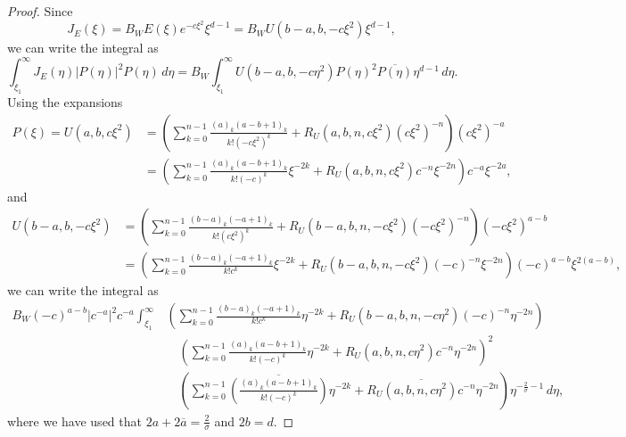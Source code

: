 \documentclass[11pt]{article}
\newcommand{\conj}[1]{\overline{#1}}
\begin{document}
\begin{proof}
  Since
  \begin{equation*}
    J_{E}(\xi) = B_{W}E(\xi)e^{-c\xi^{2}}\xi^{d - 1}
    = B_{W}U(b - a, b, -c\xi^{2})\xi^{d - 1},
  \end{equation*}
  we can write the integral as
  \begin{equation*}
    \int_{\xi_{1}}^{\infty} J_{E}(\eta)|P(\eta)|^{2}P(\eta)\,d\eta
    = B_{W}\int_{\xi_{1}}^{\infty} U(b - a, b, -c\eta^{2})P(\eta)^{2}\conj{P(\eta)}\eta^{d - 1}\,d\eta.
  \end{equation*}
  Using the expansions
  \begin{equation*}
    \begin{split}
      P(\xi)
      = U(a, b, c\xi^{2})
      &= \left(
        \sum_{k = 0}^{n - 1} \frac{(a)_{k}(a - b + 1)_{k}}{k!(-c\xi^{2})^{k}}
        + R_{U}(a, b, n, c\xi^{2})\left(c\xi^{2}\right)^{-n}
        \right)\left(c\xi^{2}\right)^{-a}\\
      &= \left(
        \sum_{k = 0}^{n - 1} \frac{(a)_{k}(a - b + 1)_{k}}{k!(-c)^{k}}\xi^{-2k}
        + R_{U}(a, b, n, c\xi^{2})c^{-n}\xi^{-2n}
        \right)c^{-a}\xi^{-2a},
    \end{split}
  \end{equation*}
  and
  \begin{equation*}
    \begin{split}
      U(b - a, b, -c\xi^{2})
      &= \left(
        \sum_{k = 0}^{n - 1} \frac{(b - a)_{k}(-a + 1)_{k}}{k!(c\xi^{2})^{k}}
        + R_{U}(b - a, b, n, -c\xi^{2})\left(-c\xi^{2}\right)^{-n}
        \right)\left(-c\xi^{2}\right)^{a - b}\\
      &= \left(
        \sum_{k = 0}^{n - 1} \frac{(b - a)_{k}(-a + 1)_{k}}{k!c^{k}}\xi^{-2k}
        + R_{U}(b - a, b, n, -c\xi^{2})(-c)^{-n}\xi^{-2n}
        \right)(-c)^{a - b}\xi^{2(a - b)},
    \end{split}
  \end{equation*}
  we can write the integral as
  \begin{equation*}
    \begin{split}
      B_{W}(-c)^{a - b}|c^{-a}|^{2}c^{-a}\int_{\xi_{1}}^{\infty}
      &\left(
        \sum_{k = 0}^{n - 1} \frac{(b - a)_{k}(-a + 1)_{k}}{k!c^{k}}\eta^{-2k}
        + R_{U}(b - a, b, n, -c\eta^{2})(-c)^{-n}\eta^{-2n}
        \right)\\
      &\quad\left(
        \sum_{k = 0}^{n - 1} \frac{(a)_{k}(a - b + 1)_{k}}{k!(-c)^{k}}\eta^{-2k}
        + R_{U}(a, b, n, c\eta^{2})c^{-n}\eta^{-2n}
        \right)^{2}\\
      &\quad\left(
        \sum_{k = 0}^{n - 1} \conj{\left(\frac{(a)_{k}(a - b + 1)_{k}}{k!(-c)^{k}}\right)}\eta^{-2k}
        + \conj{R_{U}(a, b, n, c\eta^{2})c^{-n}}\eta^{-2n}
        \right)\eta^{-\frac{2}{\sigma} - 1}\,d\eta,
    \end{split}
  \end{equation*}
  where we have used that \(2a + 2\conj{a} = \frac{2}{\sigma}\)
  and \(2b = d\).
\end{proof}
\end{document}
